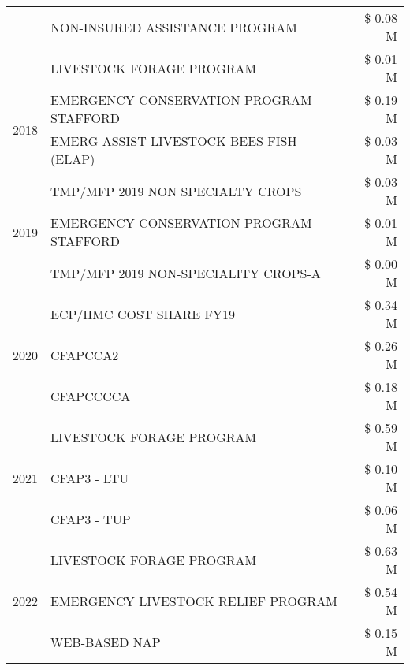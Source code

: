 \begin{tabular}{llr}
 & NON-INSURED ASSISTANCE PROGRAM & \$ 0.08 M \\
 & LIVESTOCK FORAGE PROGRAM & \$ 0.01 M \\
\cline{1-3}
\multirow[t]{2}{*}{2018} & EMERGENCY CONSERVATION PROGRAM STAFFORD & \$ 0.19 M \\
 & EMERG ASSIST LIVESTOCK BEES FISH (ELAP) & \$ 0.03 M \\
\cline{1-3}
\multirow[t]{3}{*}{2019} & TMP/MFP 2019 NON SPECIALTY CROPS & \$ 0.03 M \\
 & EMERGENCY CONSERVATION PROGRAM STAFFORD & \$ 0.01 M \\
 & TMP/MFP 2019 NON-SPECIALITY CROPS-A & \$ 0.00 M \\
\cline{1-3}
\multirow[t]{3}{*}{2020} & ECP/HMC COST SHARE FY19 & \$ 0.34 M \\
 & CFAPCCA2 & \$ 0.26 M \\
 & CFAPCCCCA & \$ 0.18 M \\
\cline{1-3}
\multirow[t]{3}{*}{2021} & LIVESTOCK FORAGE PROGRAM & \$ 0.59 M \\
 & CFAP3 - LTU & \$ 0.10 M \\
 & CFAP3 - TUP & \$ 0.06 M \\
\cline{1-3}
\multirow[t]{3}{*}{2022} & LIVESTOCK FORAGE PROGRAM & \$ 0.63 M \\
 & EMERGENCY LIVESTOCK RELIEF PROGRAM & \$ 0.54 M \\
 & WEB-BASED NAP & \$ 0.15 M \\
\cline{1-3}
\bottomrule
\end{tabular}
